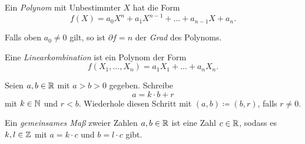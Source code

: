 \documentclass{cheat-sheet}
\begin{document}





\begin{defn}
  Ein \emph{Polynom} mit Unbestimmter $X$ hat die Form
  \[ f(X) = a_0 X^n + a_1 X^{n-1} + ... + a_{n-1} X + a_n. \]
\end{defn}

\begin{defn}
  Falls oben $a_0 \not= 0$ gilt, so ist $\partial f = n$ der \emph{Grad} des Polynoms.
\end{defn}


\begin{defn}
  Eine \emph{Linearkombination} ist ein Polynom der Form
  \[ f(X_1, ..., X_n) = a_1 X_1 + ... + a_n X_n. \]
\end{defn}






\begin{alg}[Euklid]
  Seien $a, b \in \mathbb{R}$ mit $a {>} b {>} 0$ gegeben. Schreibe
  \[ a = k \cdot b + r \]
  mit $k \in \mathbb{N}$ und $r < b$. Wiederhole diesen Schritt mit $(a, b) \coloneqq (b, r)$, falls $r \not= 0$.
\end{alg}

\begin{defn}
  Ein \emph{gemeinsames Maß} zweier Zahlen $a, b \in \mathbb{R}$ ist eine Zahl $c \in \mathbb{R}$, sodass es $k, l \in \mathbb{Z}$ mit $a = k \cdot c$ und $b = l \cdot c$ gibt.
\end{defn}
\end{document}
